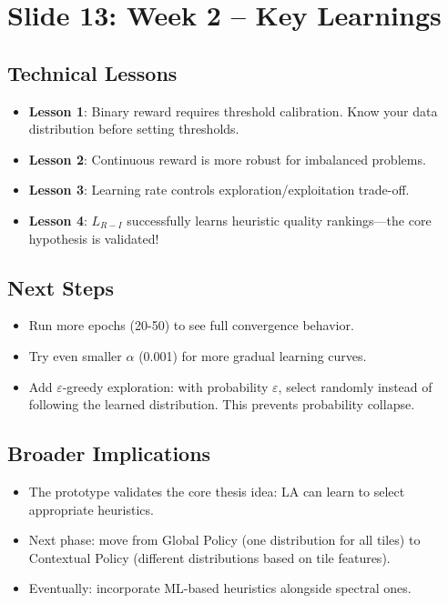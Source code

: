 \documentclass[11pt]{article}
\newenvironment{talkingpoints}{%
  \begin{itemize}[leftmargin=1.5em, itemsep=0.3em]
}{%
  \end{itemize}
}
\begin{document}
\section{Slide 13: Week 2 -- Key Learnings}

\subsection{Technical Lessons}

\begin{talkingpoints}
  \item \textbf{Lesson 1}: Binary reward requires threshold calibration. Know your data distribution before setting thresholds.
  \item \textbf{Lesson 2}: Continuous reward is more robust for imbalanced problems.
  \item \textbf{Lesson 3}: Learning rate controls exploration/exploitation trade-off.
  \item \textbf{Lesson 4}: $L_{R-I}$ successfully learns heuristic quality rankings---the core hypothesis is validated!
\end{talkingpoints}

\subsection{Next Steps}

\begin{talkingpoints}
  \item Run more epochs (20-50) to see full convergence behavior.
  \item Try even smaller $\alpha$ (0.001) for more gradual learning curves.
  \item Add $\varepsilon$-greedy exploration: with probability $\varepsilon$, select randomly instead of following the learned distribution. This prevents probability collapse.
\end{talkingpoints}

\subsection{Broader Implications}

\begin{talkingpoints}
  \item The prototype validates the core thesis idea: LA can learn to select appropriate heuristics.
  \item Next phase: move from Global Policy (one distribution for all tiles) to Contextual Policy (different distributions based on tile features).
  \item Eventually: incorporate ML-based heuristics alongside spectral ones.
\end{talkingpoints}
\end{document}
